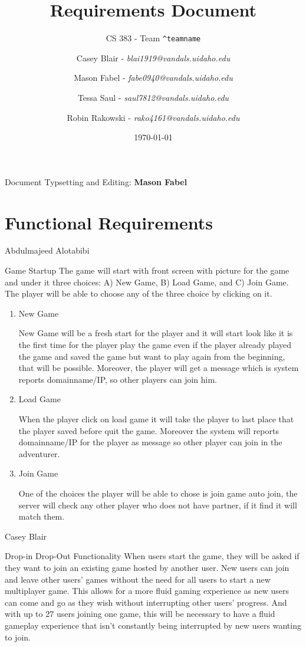 \documentclass[12pt]{report}
\title{Requirements Document}
\subtitle{CS 383 - Team \texttt{\textasciicircum teamname}}
\author{
     Casey Blair - \textit{blai1919@vandals.uidaho.edu} \\
\and Mason Fabel - \textit{fabe0940@vandals.uidaho.edu} \\
\and Tessa Saul - \textit{saul7812@vandals.uidaho.edu} \\
\and Robin Rakowski - \textit{rako4161@vandals.uidaho.edu} \\
}
\date{\today}
\begin{document}
\maketitle

\tableofcontents
Document Typsetting and Editing: \textbf{Mason Fabel}
\clearpage

\chapter{Functional Requirements}

\begin{section}{Abdulmajeed Alotabibi}
\begin{subsection}{Game Startup}
The game will start with front screen with picture for the game and under
it three choices: A) New Game, B) Load Game, and C) Join Game. The player
will be able to choose any of the three choice by clicking on it.

\begin{enumerate}
\item New Game

New Game will be a fresh start for the player and it will start look like
it is the first time for the player play the game even if the player
already played the game and saved the game but want to play again from the
beginning, that will be possible. Moreover, the player will get a message
which is system reports domainname/IP, so other players can join him.

\item Load Game

When the player click on load game it will take the player to last place
that the player saved before quit the game. Moreover the system will
reports domainname/IP for the player as message so other player can join in
the adventurer.

\item Join Game

One of the choices the player will be able to chose is join game auto join,
the server will check any other player who does not have partner, if it
find it will match them.
\end{enumerate}
\end{subsection}
\end{section}

\begin{section}{Casey Blair}
\begin{subsection}{Drop-in Drop-Out Functionality}
When users start the game, they will be asked if they want to join an
existing game hosted by another user. New users can join and leave other
users’ games without the need for all users to start a new multiplayer game. This allows
for a more fluid gaming experience as new users can come and go as they
wish without interrupting other users’ progress. And with up to 27 users
joining one game, this will be necessary to have a fluid gameplay
experience that isn’t constantly being interrupted by new users wanting to
join.
\end{subsection}
\end{section}
\end{document}
